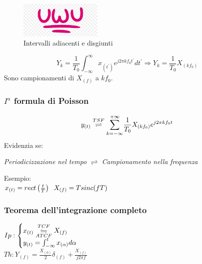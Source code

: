                     \begin{figure}[H]
                        \centering
                        \includegraphics[width=4cm]{media/uwu.png}
                        \caption{Intervalli adiacenti e disgiunti}
                        \label{fig:Intervalli adiacenti}
                    \end{figure}
                    \[
                        Y_k = \frac{1}{T_0}\int_{-\infty}^{\infty} x_{(t^\prime)} e^{j2\pi kf_0t^\prime}dt^\prime \Rightarrow Y_k = \frac{1}{T_0} X_{(kf_0)}
                    \]
                    Sono campionamenti di $X_{(f)}$ a $kf_0$.\\
                
                \subsubsection{$I^a$ formula di Poisson}
                    \[
                        y_{(t)} \overset{TSF}{\rightleftharpoons}\overunderset{+\infty}{k = -\infty}{\sum} \frac{1}{T_0} X_{(kf_0)} e^{j2\pi kf_0t}    
                    \]
                    Evidenzia se:
                    \begin{center}
                        \emph{Periodicizzazione nel tempo} $\rightleftharpoons$ \emph{Campionamento nella frequenza}
                    \end{center}
                    
                    Esempio:\\
                    $x_{(t)} = rect\left(\frac{t}{T}\right) \hspace{.2cm} X_{(f)} = Tsinc(fT)$
                    
                \subsubsection{Teorema dell'integrazione completo}\label{Teorema integrazione completo}
                    $Ip:\begin{cases}
                        x_{(t)} \overunderset{TCF}{ATCF}{\leftrightharpoons} X_{(f)}\\
                        y_{(t)} = \int_{-\infty}^{t} x_{(\alpha)} d\alpha
                    \end{cases}$\\
                    $Th: Y_{(f)} =\frac{X_{(0)}}{2}\delta_{(f)} +\frac{X_{(f)}}{j2\pi f}$ \\
                    

